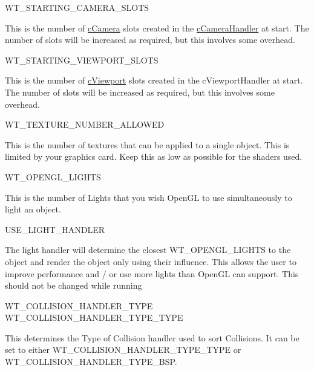 \begin{DoxyItemize}
\item WT\_\-STARTING\_\-CAMERA\_\-SLOTS
\begin{DoxyItemize}
\item This is the number of \hyperlink{classc_camera}{cCamera} slots created in the \hyperlink{classc_camera_handler}{cCameraHandler} at start. The number of slots will be increased as required, but this involves some overhead.
\end{DoxyItemize}
\item WT\_\-STARTING\_\-VIEWPORT\_\-SLOTS
\begin{DoxyItemize}
\item This is the number of \hyperlink{classc_viewport}{cViewport} slots created in the cViewportHandler at start. The number of slots will be increased as required, but this involves some overhead.
\end{DoxyItemize}
\item WT\_\-TEXTURE\_\-NUMBER\_\-ALLOWED
\begin{DoxyItemize}
\item This is the number of textures that can be applied to a single object. This is limited by your graphics card. Keep this as low as possible for the shaders used.
\end{DoxyItemize}
\end{DoxyItemize}
\begin{DoxyItemize}
\item WT\_\-OPENGL\_\-LIGHTS
\begin{DoxyItemize}
\item This is the number of Lights that you wish OpenGL to use simultaneously to light an object.
\end{DoxyItemize}
\end{DoxyItemize}
\begin{DoxyItemize}
\item USE\_\-LIGHT\_\-HANDLER
\begin{DoxyItemize}
\item The light handler will determine the closest WT\_\-OPENGL\_\-LIGHTS to the object and render the object only using their influence. This allows the user to improve performance and / or use more lights than OpenGL can support. This should not be changed while running
\end{DoxyItemize}
\end{DoxyItemize}
\begin{DoxyItemize}
\item WT\_\-COLLISION\_\-HANDLER\_\-TYPE WT\_\-COLLISION\_\-HANDLER\_\-TYPE\_\-TYPE
\begin{DoxyItemize}
\item This determines the Type of Collision handler used to sort Collisions. It can be set to either WT\_\-COLLISION\_\-HANDLER\_\-TYPE\_\-TYPE or WT\_\-COLLISION\_\-HANDLER\_\-TYPE\_\-BSP.
\end{DoxyItemize}
\end{DoxyItemize}
